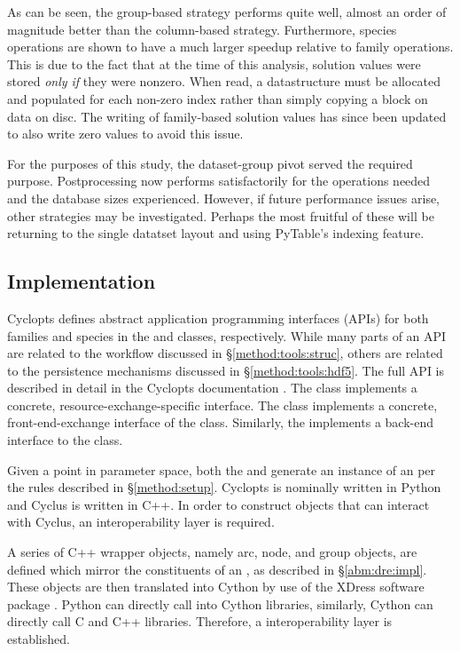 As can be seen, the group-based strategy performs quite well, almost an order of
magnitude better than the column-based strategy. Furthermore, species operations
are shown to have a much larger speedup relative to family operations. This is
due to the fact that at the time of this analysis, solution values were stored
\textit{only if} they were nonzero. When read, a datastructure must be allocated
and populated for each non-zero index rather than simply copying a block on data
on disc. The writing of family-based solution values has since been updated to
also write zero values to avoid this issue.

For the purposes of this study, the dataset-group pivot served the required
purpose. Postprocessing now performs satisfactorily for the operations needed
and the database sizes experienced. However, if future performance issues arise,
other strategies may be investigated. Perhaps the most fruitful of these will be
returning to the single datatset layout and using PyTable's indexing feature. 

\subsection{Implementation}

Cyclopts defines abstract application programming interfaces (APIs) for both
families and species in the  and 
classes, respectively. While many parts of an API are related to the workflow
discussed in \S \ref{method:tools:struc}, others are related to the persistence
mechanisms discussed in \S \ref{method:tools:hdf5}. The full API is described in
detail in the Cyclopts documentation \cite{cyclopts}. The 
class implements a concrete, resource-exchange-specific 
interface. The  class implements a concrete,
front-end-exchange interface of the  class. Similarly, the
 implements a back-end interface to the class.

Given a point in parameter space, both the  and
 generate an instance of an  per the
rules described in \S \ref{method:setup}. Cyclopts is nominally written in
Python and Cyclus is written in C++. In order to construct objects that can
interact with Cyclus, an interoperability layer is required. 

A series of C++ wrapper objects, namely arc, node, and group objects, are
defined which mirror the constituents of an , as described
in \S \ref{abm:dre:impl}. These objects are then translated into Cython \cite{}
by use of the XDress software package \cite{xdress}. Python can directly call
into Cython libraries, similarly, Cython can directly call C and C++
libraries. Therefore, a interoperability layer is established.

